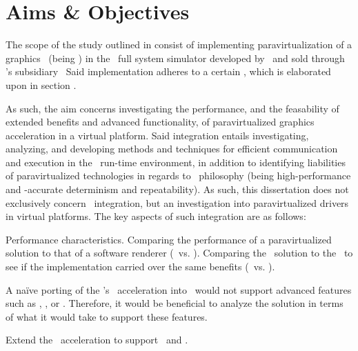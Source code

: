 
\chapter{Aims \& Objectives}
\label{cha:aimsandobjectives}
The scope of the study outlined in  consist of implementing paravirtualization of a graphics \dvttermapi\ (being \dvttermopenglestwopointo ) in the \dvttermsimics\ full system simulator developed by \dvttermintel\ and sold through \dvttermintel 's subsidiary \dvttermwindriver\ 
Said implementation adheres to a certain \dvttermreferenceimplementation , which is elaborated upon in section .

As such, the aim concerns investigating the performance, and the feasability of extended benefits and advanced functionality, of paravirtualized graphics acceleration in a virtual platform.
Said integration entails investigating, analyzing, and developing methods and techniques for efficient communication and execution in the \dvttermsimics\ run-time environment, in addition to identifying liabilities of paravirtualized technologies in regards to \dvttermsimics\ philosophy (being high-performance and \dvttermtiming -accurate determinism and repeatability).
As such, this dissertation does not exclusively concern \dvttermsimics\ integration, but an investigation into paravirtualized drivers in virtual platforms.
The key aspects of such integration are as follows:

\begin{enumerate*}
	\item \label{itm:enum_aspects_performance} Performance characteristics.
	Comparing the performance of a paravirtualized solution to that of a software renderer (\dvttermsimics\ vs. \dvttermsimics ).
	Comparing the \dvttermsimics\ solution to the \dvttermreferencesolution\ to see if the implementation carried over the same benefits (\dvttermsimics\ vs. \dvttermreferencesolution ).
	\item \label{itm:enum_aspects_advancedanalyze} A naïve porting of the \dvttermreferenceimplementation 's \dvttermopengles\ acceleration into \dvttermsimics\ would not support advanced features such as \dvttermdeterministicexecution , \dvttermcheckpointing , or \dvttermreverseexecution .
	Therefore, it would be beneficial to analyze the solution in terms of what it would take to support these features.
	\item \label{itm:enum_aspects_advancedimplement} Extend the \dvttermopengles\ acceleration to support \dvttermcheckpointing\ and \dvttermreverseexecution .
\end{enumerate*}

